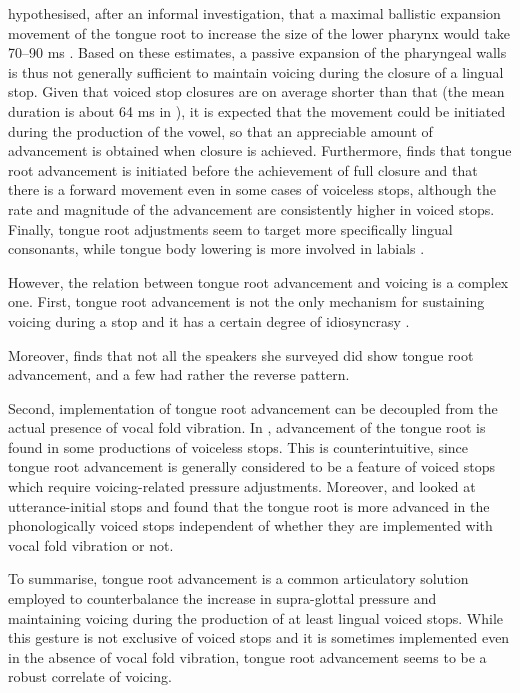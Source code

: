 \documentclass[preprint]{JASAnew}
\begin{document}
\citet{rothenberg1967} hypothesised, after an informal investigation,
that a maximal ballistic expansion movement of the tongue root to
increase the size of the lower pharynx would take 70--90 ms
\citep[99]{rothenberg1967}. Based on these estimates, a passive
expansion of the pharyngeal walls is thus not generally sufficient to
maintain voicing during the closure of a lingual stop. Given that voiced
stop closures are on average shorter than that (the mean duration is
about 64 ms in \citealt{luce1985}), it is expected that the movement
could be initiated during the production of the vowel, so that an
appreciable amount of advancement is obtained when closure is achieved.
Furthermore, \citet{westbury1983} finds that tongue root advancement is
initiated before the achievement of full closure and that there is a
forward movement even in some cases of voiceless stops, although the
rate and magnitude of the advancement are consistently higher in voiced
stops. Finally, tongue root adjustments seem to target more specifically
lingual consonants, while tongue body lowering is more involved in
labials \citep{perkell1969, westbury1983, vazquez-alvarez2007}.

However, the relation between tongue root advancement and voicing is a
complex one. First, tongue root advancement is not the only mechanism
for sustaining voicing during a stop
\citep{rothenberg1967, westbury1983, ohala2011} and it has a certain
degree of idiosyncrasy \citep{ahn2018}.

Moreover, \citet{ahn2018} finds that not all the speakers she surveyed
did show tongue root advancement, and a few had rather the reverse
pattern.

Second, implementation of tongue root advancement can be decoupled from
the actual presence of vocal fold vibration. In \citet{westbury1983},
advancement of the tongue root is found in some productions of voiceless
stops. This is counterintuitive, since tongue root advancement is
generally considered to be a feature of voiced stops which require
voicing-related pressure adjustments. Moreover, \citet{ahn2015, ahn2018}
and \citet{ahn2016} looked at utterance-initial stops and found that the
tongue root is more advanced in the phonologically voiced stops
independent of whether they are implemented with vocal fold vibration or
not.

To summarise, tongue root advancement is a common articulatory solution
employed to counterbalance the increase in supra-glottal pressure and
maintaining voicing during the production of at least lingual voiced
stops. While this gesture is not exclusive of voiced stops and it is
sometimes implemented even in the absence of vocal fold vibration,
tongue root advancement seems to be a robust correlate of voicing.
\end{document}
